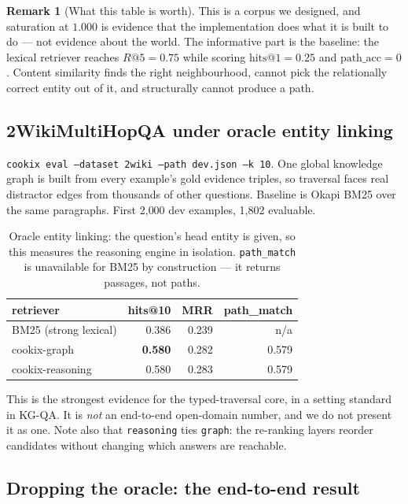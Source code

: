 \documentclass[11pt]{article}
\theoremstyle{definition}
\newtheorem{remark}[theorem]{Remark}
\newcommand{\cmd}[1]{\texttt{\small #1}}
\begin{document}
\begin{remark}[What this table is worth]
This is a corpus we designed, and saturation at $1.000$ is evidence that the
implementation does what it is built to do --- not evidence about the world. The
informative part is the baseline: the lexical retriever reaches $R@5=0.75$ while scoring
$\text{hits@}1=0.25$ and $\text{path\_acc}=0$. Content similarity finds the right
neighbourhood, cannot pick the relationally correct entity out of it, and structurally
cannot produce a path.
\end{remark}

\subsection{2WikiMultiHopQA under oracle entity linking}

\cmd{cookix eval --dataset 2wiki --path dev.json --k 10}. One global knowledge graph is
built from every example's gold evidence triples, so traversal faces real distractor
edges from thousands of other questions. Baseline is Okapi BM25 over the same
paragraphs. First 2{,}000 dev examples, 1{,}802 evaluable.

\begin{table}[h]
\centering
\begin{tabular}{lrrr}
\toprule
retriever & hits@10 & MRR & path\_match \\
\midrule
BM25 (strong lexical) & 0.386 & 0.239 & n/a \\
cookix-graph          & \textbf{0.580} & 0.282 & 0.579 \\
cookix-reasoning      & 0.580 & 0.283 & 0.579 \\
\bottomrule
\end{tabular}
\caption{Oracle entity linking: the question's head entity is given, so this measures
the reasoning engine in isolation. \texttt{path\_match} is unavailable for BM25 by
construction --- it returns passages, not paths.}
\end{table}

This is the strongest evidence for the typed-traversal core, in a setting standard in
KG-QA. It is \emph{not} an end-to-end open-domain number, and we do not present it as
one. Note also that \texttt{reasoning} ties \texttt{graph}: the re-ranking layers
reorder candidates without changing which answers are reachable.

\subsection{Dropping the oracle: the end-to-end result}
\label{sec:endtoend}
\end{document}
